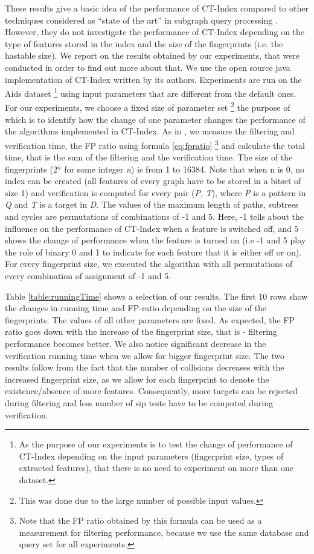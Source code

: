 \documentclass{l4proj}
\begin{document}
These results give a basic idea of the performance of CT-Index compared to other techniques considered as ``state of the art'' in subgraph query processing \cite{foteini}. However, they do not investigate the performance of CT-Index depending on the type of features stored in the index and the size of the fingerprints (i.e. the hastable size). We report on the results obtained by our experiments, that were conducted in order to find out more about that. We use the open source java implementation of CT-Index written by its authors. Experiments are run on the Aids dataset \footnote{As the purpose of our experiments is to test the change of performance of CT-Index depending on the input parameters (fingerprint size, types of extracted features), that there is no need to experiment on more than one dataset.} using input parameters that are different from the default ones. For our experiments, we choose a fixed size of parameter set \footnote{This was done due to the large number of possible input values.} the purpose of which is to identify how the change of one parameter changes the performance of the algorithms implemented in CT-Index.  As in \cite{foteini}, we measure the filtering and verification time, the FP ratio using formula \ref{eq:fpratio} \footnote{Note that the FP ratio obtained by this formula can be used as a measurement for filtering performance, because we use the same database and query set for all experiments.} and calculate the total time, that is the sum of the filtering and the verification time. The size of the fingerprints (2$^{n}$ for some integer \emph{n}) is from 1 to 16384. Note that when n is 0, no index can be created (all features of every graph have to be stored in a bitset of size 1) and verification is computed for every pair (\emph{P}, \emph{T}), where \emph{P} is a pattern in \emph{Q} and \emph{T} is a target in \emph{D}. The values of the maximum length of paths, subtrees and cycles are permutations of combinations of -1 and 5. Here, -1 tells about the influence on the performance of CT-Index when a feature is switched off, and 5 shows the change of performance when the feature is turned on (i.e -1 and 5 play the role of binary 0 and 1 to indicate for each feature that it is either off or on). For every fingerprint size, we executed the algorithm with all permutations of every combination of assignment of -1 and 5.

Table \ref{table:runningTime} shows a selection of our results. The first 10 rows show the changes in running time and FP-ratio depending on the size of the fingerprints. The values of all other parameters are fixed. As expected, the FP ratio goes down with the increase of the fingerprint size, that is - filtering performance becomes better. We also notice significant decrease in the verification running time when we allow for bigger fingerprint size. The two results follow from the fact that the number of collisions decreases with the increased fingerprint size, as we allow for each fingerprint to denote the existence/absence of more features. Consequently, more targets can be rejected during filtering and less number of \gls{sip} tests have to be computed during verification.
\end{document}
